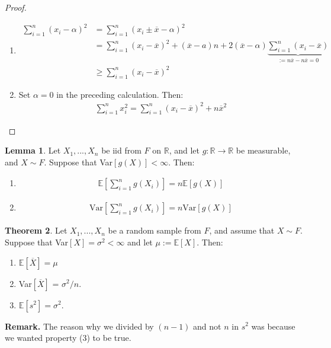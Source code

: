 \documentclass[11pt]{scrartcl}
\newcommand{\R}[0]{\mathbb{R}}
\theoremstyle{definition}
\newtheorem{theorem}{Theorem}
\newtheorem{lemma}[theorem]{Lemma}
\theoremstyle{remark}
\newcommand{\EX}[1]{\mathbb{E}\left[#1 \right]}
\begin{document}
\begin{proof}
	\begin{enumerate}[noitemsep]
		\item 
			\begin{align*}
				\sum_{i=1}^n (x_i - \alpha)^2 & = \sum_{i=1}^n (x_i \pm \overline{x} - \alpha)^2 \\
					& = \sum_{i=1}^n (x_i - \overline{x})^2 + (\overline{x} - a)n + 2(\overline{x}-\alpha) \underbrace{\sum_{i=1}^n (x_i - \overline{x})}_{:= n\overline{x} - n \overline{x} = 0} \\
					& \geq \sum_{i=1}^n (x_i - \overline{x})^2
			\end{align*}	
		\item Set $\alpha=0$ in the preceding calculation. Then: 
		\begin{align*}
			\sum_{i=1}^n x_i^2 = \sum_{i=1}^n (x_i - \overline{x})^2 + n\overline{x}^2	
		\end{align*}
	\end{enumerate}
\end{proof}

\begin{lemma}
	Let $X_1, ..., X_n$ be iid from $F$ on $\R$, and let $g: \R \rightarrow \R$ be measurable, and $X \sim F$. Suppose that Var$[g(X)] < \infty$. Then: 
	\begin{enumerate}[noitemsep]
		\item 
		\begin{align}
			\mathbb{E} \left[ 	\sum_{i=1}^n g(X_i)		\right]  = n \mathbb{E} [ g(X) ] 
		\end{align}
		\item 
		\begin{align}
			\text{Var} \left[ 	\sum_{i=1}^n g(X_i ) 	\right] =  n \text{Var}[g(X)] 
		\end{align}
	\end{enumerate}
\end{lemma}

\begin{theorem}
	Let $X_1, ..., X_n$ be a random sample from $F$, and assume that $X \sim F$. Suppose that Var$[X] = \sigma^2 < \infty$ and let $\mu := \EX{X}$. Then: 
	\begin{enumerate}[noitemsep]
		\item $\EX{\overline{X}} = \mu$
		\item Var$[\overline{X}]$ = $\sigma^2 / n$. 
		\item $\EX{s^2} = \sigma^2$. 
	\end{enumerate}
\end{theorem}
\textbf{Remark.} The reason why we divided by $(n-1)$ and not $n$ in $s^2$ was because we wanted property (3) to be true. 
\end{document}
